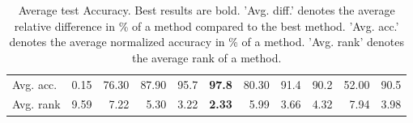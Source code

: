 \begin{table}[ht!]
\begin{tabular}{lrrrllrllrl}
  Avg. acc. & 0.15 & 76.30 & 87.90 & 95.7 & \textbf{97.8} & 80.30 & 91.4 & 90.2 & 52.00 & 90.5 \\ 
  Avg. rank & 9.59 & 7.22 & 5.30 & 3.22 & \textbf{2.33} & 5.99 & 3.66 & 4.32 & 7.94 & 3.98 \\ 
   \hline
\hline
\end{tabular}
\endgroup
\caption{Average test Accuracy. 
                  Best results are bold. 
                  'Avg. diff.' denotes the average relative difference in \% of a method compared to the best method.
                  'Avg. acc.' denotes the average normalized accuracy in \% of a method.
                  'Avg. rank' denotes the average rank of a method.} 
\label{TABLES/table_results_Accuracy}
\end{table}
